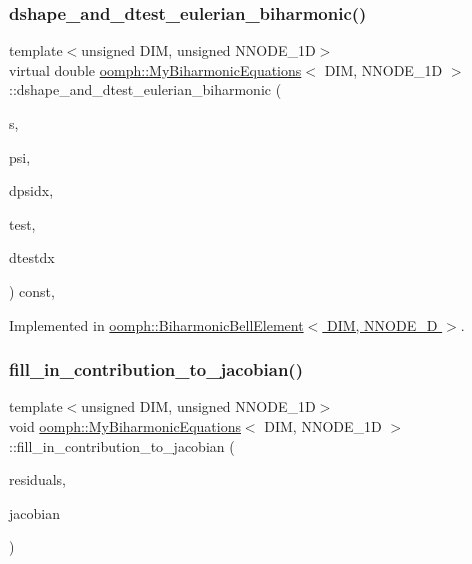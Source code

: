 \subsubsection{\texorpdfstring{dshape\+\_\+and\+\_\+dtest\+\_\+eulerian\+\_\+biharmonic()}{dshape\_and\_dtest\_eulerian\_biharmonic()}}
{\footnotesize\ttfamily template$<$unsigned D\+IM, unsigned N\+N\+O\+D\+E\+\_\+1D$>$ \\
virtual double \hyperlink{classoomph_1_1MyBiharmonicEquations}{oomph\+::\+My\+Biharmonic\+Equations}$<$ D\+IM, N\+N\+O\+D\+E\+\_\+1D $>$\+::dshape\+\_\+and\+\_\+dtest\+\_\+eulerian\+\_\+biharmonic (\begin{DoxyParamCaption}\item[{const Vector$<$ double $>$ \&}]{s,  }\item[{Shape \&}]{psi,  }\item[{D\+Shape \&}]{dpsidx,  }\item[{Shape \&}]{test,  }\item[{D\+Shape \&}]{dtestdx }\end{DoxyParamCaption}) const\hspace{0.3cm}{\ttfamily [protected]}, {}}



Implemented in \hyperlink{classoomph_1_1BiharmonicBellElement_ab4fc981e180b12acd2a9865efb42459b}{oomph\+::\+Biharmonic\+Bell\+Element$<$ D\+I\+M, N\+N\+O\+D\+E\+\_\+D $>$}.

\mbox{\label{classoomph_1_1MyBiharmonicEquations_ad5ef6af62c0ebf27bacf62be8d408c8a}} 
\subsubsection{\texorpdfstring{fill\+\_\+in\+\_\+contribution\+\_\+to\+\_\+jacobian()}{fill\_in\_contribution\_to\_jacobian()}}
{\footnotesize\ttfamily template$<$unsigned D\+IM, unsigned N\+N\+O\+D\+E\+\_\+1D$>$ \\
void \hyperlink{classoomph_1_1MyBiharmonicEquations}{oomph\+::\+My\+Biharmonic\+Equations}$<$ D\+IM, N\+N\+O\+D\+E\+\_\+1D $>$\+::fill\+\_\+in\+\_\+contribution\+\_\+to\+\_\+jacobian (\begin{DoxyParamCaption}\item[{Vector$<$ double $>$ \&}]{residuals,  }\item[{Dense\+Matrix$<$ double $>$ \&}]{jacobian }\end{DoxyParamCaption})\hspace{0.3cm}{\ttfamily [inline]}}

